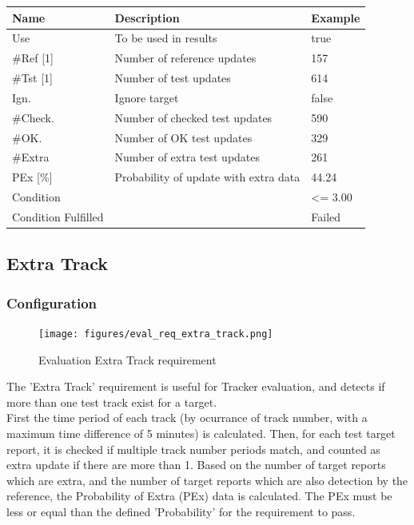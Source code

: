 \begin{center}
 \begin{table}[H]
  \begin{tabularx}{\textwidth}{ | l | X |  l | }
    \hline
    \textbf{Name} & \textbf{Description} & \textbf{Example} \\ \hline
    Use & To be used in results & true \\ \hline
    \#Ref [1] & Number of reference updates & 157 \\ \hline
    \#Tst [1] & Number of test updates & 614 \\ \hline
    Ign. & Ignore target & false \\ \hline
    \#Check. & Number of checked test updates & 590 \\ \hline
    \#OK. & Number of OK test updates & 329 \\ \hline
    \#Extra & Number of extra test updates & 261 \\ \hline
    PEx [\%] & Probability of update with extra data & 44.24 \\ \hline
    Condition &  & <= 3.00 \\ \hline
    Condition Fulfilled &  & Failed \\ \hline
\end{tabularx}
\end{table}
\end{center}

\subsection{Extra Track}
\label{sec:eval_req_extra_track} 

\subsubsection{Configuration}

\begin{figure}[H]
    \texttt{[image: figures/eval\_req\_extra\_track.png]}
  \caption{Evaluation Extra Track requirement}
\end{figure}

The 'Extra Track' requirement is useful for Tracker evaluation, and detects if more than one test track exist for a target. \\

First the time period of each track (by ocurrance of track number, with a maximum time difference of 5 minutes) is calculated. Then, for each test target report, it is checked if multiple track number periods match, and counted as extra update if there are more than 1. Based on the number of target reports which are extra, and the number of target reports which are also detection by the reference, the Probability of Extra (PEx) data is calculated. The PEx must be less or equal than the defined 'Probability' for the requirement to pass. \\

